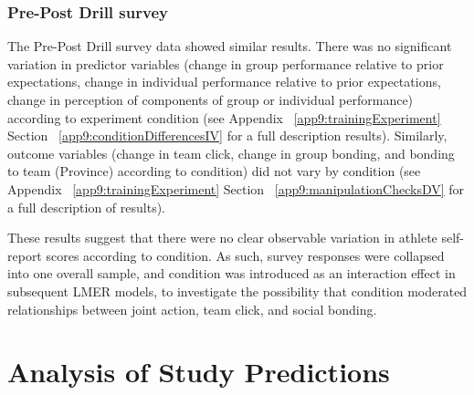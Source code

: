 





\subsubsection{Pre-Post Drill survey}
The Pre-Post Drill survey data showed similar results.
There was no significant variation in predictor variables (change in group performance relative to prior expectations, change in individual performance relative to prior expectations, change in perception of components of group or individual performance) according to experiment condition (see Appendix ~\ref{app9:trainingExperiment} Section ~\ref{app9:conditionDifferencesIV} for a full description results).  Similarly, outcome variables (change in team click, change in group bonding, and bonding to team (Province) according to condition) did not vary by condition (see Appendix ~\ref{app9:trainingExperiment} Section ~\ref{app9:manipulationChecksDV} for a full description of results).


These results suggest that there were no clear observable variation in athlete self-report scores according to condition.  As such, survey responses were collapsed into one overall sample, and condition was introduced as an interaction effect in subsequent LMER models, to investigate the possibility that condition moderated relationships between joint action, team click, and social bonding.














\section{Analysis of Study Predictions\label{sect:resultsStudyPredictions}}

